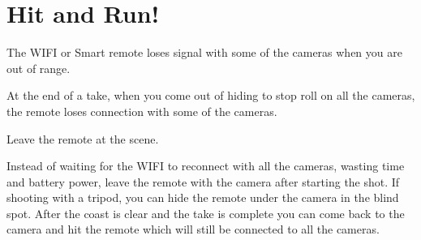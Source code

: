 \chapter{Hit and Run!}
\pagecolor{white}
\label{chap:15}
\begin{fullwidth}


\problem

{\large The WIFI or Smart remote loses signal with some of the cameras when you are out of range. 
 \par}

At the end of a take, when you come out of hiding to stop roll on all the cameras, the remote loses connection with some of the cameras.


\solution

{\large Leave the remote at the scene. 

 \par}

Instead of waiting for the WIFI to reconnect with all the cameras, wasting time and battery power, leave the remote with the camera after starting the shot. If shooting with a tripod, you can hide the remote under the camera in the blind spot. After the coast is clear and the take is complete you can come back to the camera and hit the remote which will still be connected to all the cameras.




\clearpage
\end{fullwidth}
